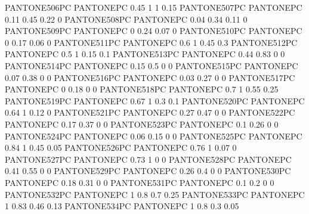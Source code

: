  {PANTONE506PC} {PANTONE\SpotSpace PC} {0.45 1 1 0.15}
 {PANTONE507PC} {PANTONE\SpotSpace PC} {0.11 0.45 0.22 0}
 {PANTONE508PC} {PANTONE\SpotSpace PC} {0.04 0.34 0.11 0}
 {PANTONE509PC} {PANTONE\SpotSpace PC} {0 0.24 0.07 0}
 {PANTONE510PC} {PANTONE\SpotSpace PC} {0 0.17 0.06 0}
 {PANTONE511PC} {PANTONE\SpotSpace PC} {0.6 1 0.45 0.3}
 {PANTONE512PC} {PANTONE\SpotSpace PC} {0.5 1 0.15 0.1}
 {PANTONE513PC} {PANTONE\SpotSpace PC} {0.44 0.83 0 0}
 {PANTONE514PC} {PANTONE\SpotSpace PC} {0.15 0.5 0 0}
 {PANTONE515PC} {PANTONE\SpotSpace PC} {0.07 0.38 0 0}
 {PANTONE516PC} {PANTONE\SpotSpace PC} {0.03 0.27 0 0}
 {PANTONE517PC} {PANTONE\SpotSpace PC} {0 0.18 0 0}
 {PANTONE518PC} {PANTONE\SpotSpace PC} {0.7 1 0.55 0.25}
 {PANTONE519PC} {PANTONE\SpotSpace PC} {0.67 1 0.3 0.1}
 {PANTONE520PC} {PANTONE\SpotSpace PC} {0.64 1 0.12 0}
 {PANTONE521PC} {PANTONE\SpotSpace PC} {0.27 0.47 0 0}
 {PANTONE522PC} {PANTONE\SpotSpace PC} {0.17 0.37 0 0}
 {PANTONE523PC} {PANTONE\SpotSpace PC} {0.1 0.26 0 0}
 {PANTONE524PC} {PANTONE\SpotSpace PC} {0.06 0.15 0 0}
 {PANTONE525PC} {PANTONE\SpotSpace PC} {0.84 1 0.45 0.05}
 {PANTONE526PC} {PANTONE\SpotSpace PC} {0.76 1 0.07 0}
 {PANTONE527PC} {PANTONE\SpotSpace PC} {0.73 1 0 0}
 {PANTONE528PC} {PANTONE\SpotSpace PC} {0.41 0.55 0 0}
 {PANTONE529PC} {PANTONE\SpotSpace PC} {0.26 0.4 0 0}
 {PANTONE530PC} {PANTONE\SpotSpace PC} {0.18 0.31 0 0}
 {PANTONE531PC} {PANTONE\SpotSpace PC} {0.1 0.2 0 0}
 {PANTONE532PC} {PANTONE\SpotSpace PC} {1 0.8 0.7 0.25}
 {PANTONE533PC} {PANTONE\SpotSpace PC} {1 0.83 0.46 0.13}
 {PANTONE534PC} {PANTONE\SpotSpace PC} {1 0.8 0.3 0.05}
